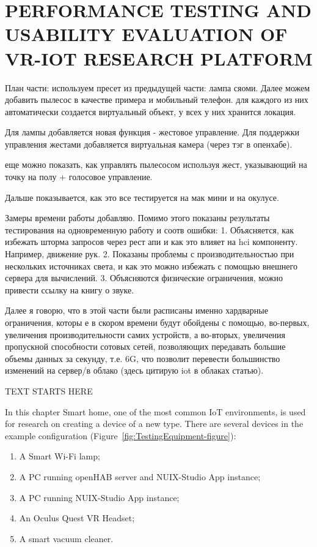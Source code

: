 
\chapter{PERFORMANCE TESTING AND USABILITY EVALUATION OF VR-IOT RESEARCH PLATFORM}


План части: используем пресет из предыдущей части: лампа сяоми. Далее можем добавить пылесос в качестве примера и мобильный телефон. для каждого из них автоматически создается виртуальный объект, у всех у них хранится локация.

Для лампы добавляется новая функция - жестовое управление. Для поддержки управления жестами добавляется виртуальная камера (через тэг в опенхабе).

еще можно показать, как управлять пылесосом используя жест, указывающий на точку на полу + голосовое управление.

Дальше показывается, как это все тестируется на мак мини и на окулусе.

Замеры времени работы добавляю. Помимо этого показаны результаты тестирования на одновременную работу и соотв ошибки:
1. Объясняется, как избежать шторма запросов через рест апи и как это влияет на hci компоненту. Например, движение рук.
2. Показаны проблемы с производительностью при нескольких источниках света, и как это можно избежать с помощью внешнего сервера для вычислений.
3. Объясняются физические ограничения, можно привести ссылку на книгу о звуке.

Далее я говорю, что в этой части были расписаны именно хардварные ограничения, которы е в скором времени будут обойдены с помощью, во-первых, увеличения производительности самих устройств, а во-вторых, увеличения пропускной способности сотовых сетей, позволяющих передавать большие объемы данных за секунду, т.е. 6G, что позволит перевести большинство изменений на сервер/в облако (здесь цитирую iot в облаках статью).


TEXT STARTS HERE

In this chapter Smart home, one of the most common IoT environments, is used for research on creating a device of a new type. There are several devices in the example configuration (Figure~\ref{fig:TestingEquipment-figure}): 
\begin{enumerate}
    \item A Smart Wi-Fi lamp;
    \item A PC running openHAB server and NUIX-Studio App instance;
    \item A PC running NUIX-Studio App instance;
    \item An Oculus Quest VR Headset;
    \item A smart vacuum cleaner.
\end{enumerate}

